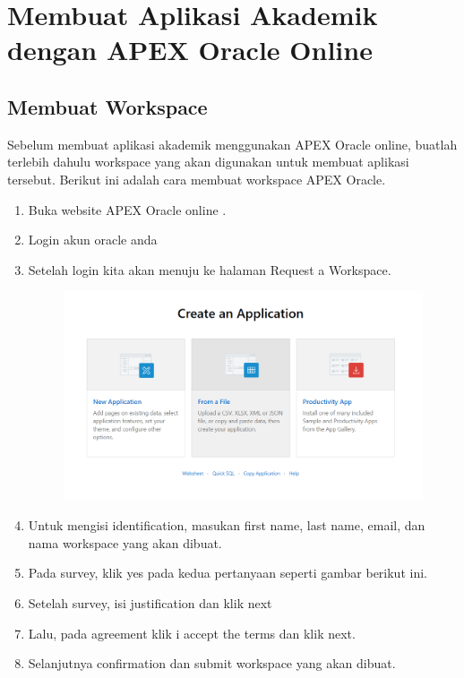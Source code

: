 \chapter{Membuat Aplikasi Akademik dengan APEX Oracle Online}

\section{Membuat Workspace}
Sebelum membuat aplikasi akademik menggunakan APEX Oracle online, buatlah terlebih dahulu workspace yang akan digunakan untuk membuat aplikasi tersebut. Berikut ini adalah cara membuat workspace APEX Oracle.
\begin{enumerate}
    \item Buka website APEX Oracle online .
    \item Login akun oracle anda
    \item Setelah login kita akan menuju ke halaman Request a Workspace.

\begin{figure}[!htbp]
    \centering
    \includegraphics[scale=0.5]{gambar/1.png}
    \label{penanda}
\end{figure}

    \item Untuk mengisi identification, masukan first name, last name, email, dan nama workspace yang akan dibuat.
    \item Pada survey, klik yes pada kedua pertanyaan seperti gambar berikut ini.
    \item Setelah survey, isi justification dan klik next
    \item Lalu, pada agreement klik i accept the terms dan klik next.
    \item Selanjutnya confirmation dan submit workspace yang akan dibuat.

\end{enumerate}

